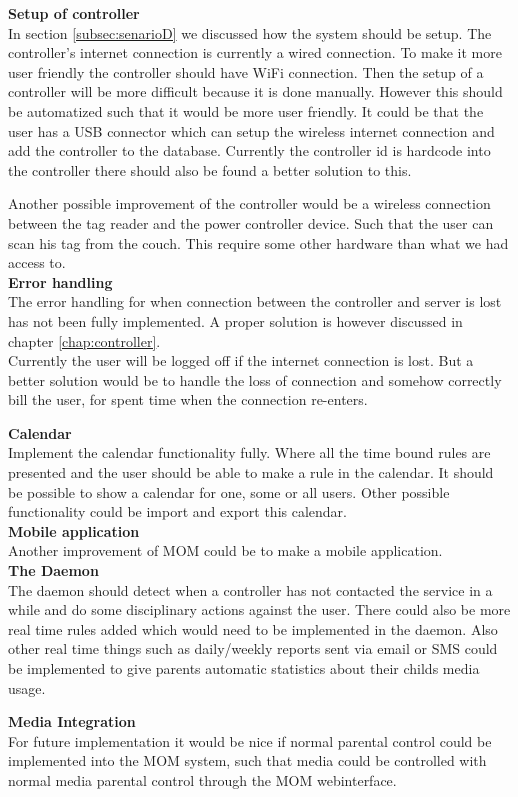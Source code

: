 \textbf{Setup of controller}\\
In section \vref{subsec:senarioD} we discussed how the system should be setup. The controller's internet connection is currently a wired connection. To make it more user friendly the controller should have WiFi connection. Then the setup of a controller will be more difficult because it is done manually. However this should be automatized such that it would be more user friendly. It could be that the user has a USB connector which can setup the wireless internet connection and add the controller to the database. Currently the controller id is hardcode into the controller there should also be found a better solution to this. 

Another possible improvement of the controller would be a wireless connection between the tag reader and the power controller device. Such that the user can scan his tag from the couch. This require some other hardware than what we had access to.\\

\textbf{Error handling}\\
The error handling for when connection between the controller and server is lost has not been fully implemented. A proper solution is however discussed in chapter \vref{chap:controller}.\\
Currently the user will be logged off if the internet connection is lost. But a better solution would be to handle the loss of connection and somehow correctly bill the user, for spent time when the connection re-enters.

\textbf{Calendar}\\
Implement the calendar functionality fully. Where all the time bound rules are presented and the user should be able to make a rule in the calendar. It should be possible to show a calendar for one, some or all users. Other possible functionality could be import and export this calendar.\\

\textbf{Mobile application}\\
Another improvement of MOM could be to make a mobile application.\\

\textbf{The Daemon}\\
The daemon should detect when a controller has not contacted the service in a while and do some disciplinary actions against the user. There could also be more real time rules added which would need to be implemented in the daemon. Also other real time things such as daily/weekly reports sent via email or SMS could be implemented to give parents automatic statistics about their childs media usage. 

\textbf{Media Integration}\\
For future implementation it would be nice if normal parental control could be implemented into the MOM system, such that media could be controlled with normal media parental control through the MOM webinterface.